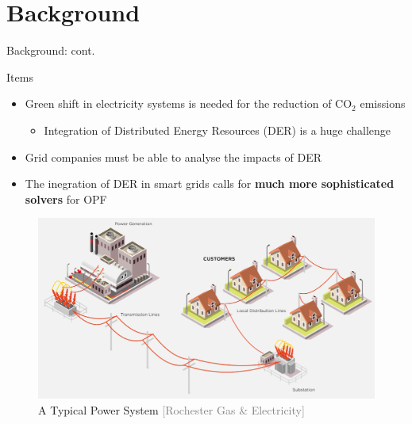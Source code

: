 \documentclass{beamer}
\begin{document}
\section{Background}
\begin{frame}{Background: cont.}
\begin{block}{Items}
\begin{itemize}
\item <1-> \small Green shift in electricity systems is needed for the reduction of $\mathrm{CO_2}$ emissions
\begin{itemize}  
\item<2-> \tiny  Integration of Distributed Energy Resources (DER) is a huge challenge
\end{itemize}
\item<3->\small Grid companies must be able to analyse the impacts of DER
\item<5->\small The inegration of DER in smart grids calls for \textbf{much more sophisticated solvers} for OPF
\end{itemize}
\end{block}
\begin{figure}
\includegraphics[scale=0.06]{Figures/PowerSys.png}
 \caption{A Typical Power System \textcolor{gray}{\tiny[Rochester Gas \& Electricity]}}
\end{figure}

\end{frame}
\end{document}
